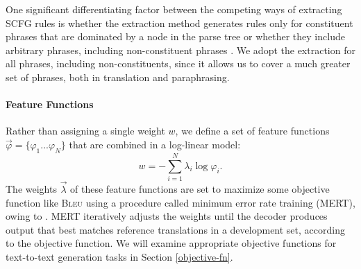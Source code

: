 \documentclass[11pt]{article}
\begin{document}
One significant differentiating factor between the competing ways of
extracting SCFG rules is whether the extraction method generates rules
only for constituent phrases that are dominated by a node in the parse
tree \cite{Galley2004,cohn-lapata:2008} or whether they include
arbitrary phrases, including non-constituent phrases
\cite{Zollmann2006,Callison-Burch2008}. We adopt the extraction for
all phrases, including non-constituents, since it allows us to cover a
much greater set of phrases, both in translation and paraphrasing.




\paragraph{Feature Functions}

Rather than assigning a single weight $w$, we define a set of feature
functions $\vec{\varphi} = \{\varphi_1 ... \varphi_N \}$ that are combined in a
log-linear model:
\begin{equation}
  w = -\sum_{i=1}^N \lambda_i \log \varphi_i .
\end{equation}
The weights $\vec{\lambda}$ of these feature functions are set to
maximize some objective function like \textsc{Bleu}
\cite{Papineni2002} using a procedure called minimum error rate
training (MERT), owing to .  MERT iteratively
adjusts the weights until the decoder produces output that best
matches reference translations in a development set, according to the
objective function.  We will examine appropriate objective functions
for text-to-text generation tasks in Section \ref{objective-fn}.
\end{document}
